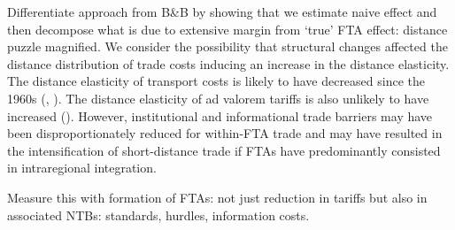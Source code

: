 \documentclass[12pt,twoside,a4paper,notitlepage]{article}
\begin{document}

Differentiate approach from B\&B by showing that we estimate naive effect and then decompose what is due to extensive margin from `true' FTA effect: distance puzzle magnified.
We consider the possibility that structural changes affected the distance distribution of trade costs inducing an increase in the distance elasticity.
The distance elasticity of transport costs is likely to have decreased since the 1960s (\cite{Hummels2007}, \cite{Berthelon2008}).
The distance elasticity of ad valorem tariffs is also unlikely to have increased (\cite{Berthelon2008}).
However, institutional and informational trade barriers may have been disproportionately reduced for within-FTA trade and may have resulted in the intensification of short-distance trade if FTAs have predominantly consisted in intraregional integration.

Measure this with formation of FTAs: not just reduction in tariffs but also in associated NTBs: standards, hurdles, information costs.
\end{document}
